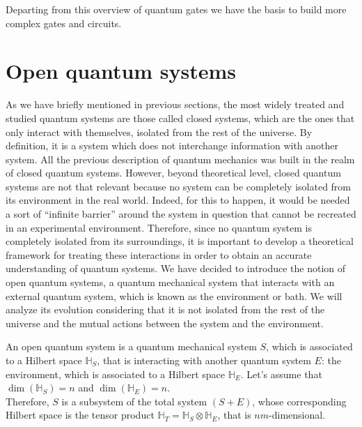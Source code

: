 Departing from this overview of quantum gates we have the basis to build more complex gates and circuits.

\section{Open quantum systems}
As we have briefly mentioned in previous sections, the most widely treated and studied quantum systems are those called closed systems, which are the ones that only interact with themselves, isolated from the rest of the universe. By definition, it is a system which does not interchange information with another system. All the previous description of quantum mechanics was built in the realm of closed quantum systems. However, beyond theoretical level, closed quantum systems are not that relevant because no system can be completely isolated from its environment in the real world. Indeed, for this to happen, it would be needed a sort of ``infinite barrier'' around the system in question that cannot be recreated in an experimental environment. Therefore, since no quantum system is completely isolated from its surroundings, it is important to develop a theoretical framework for treating these interactions in order to obtain an accurate understanding of quantum systems. We have decided to introduce the notion of open quantum systems, a quantum mechanical system that interacts with an external quantum system, which is known as the environment or bath. We will analyze its evolution considering that it is not isolated from the rest of the universe and the mutual actions between the system and the environment. 


\begin{definicion}
    An open quantum system is a quantum mechanical system $S$, which is associated to a Hilbert space $\mathbb{H}_S$, that is interacting with another quantum system $E$: the environment, which is associated to a Hilbert space $\mathbb{H}_E$. Let's assume that $\dim (\mathbb{H}_S)=n$ and $\dim(\mathbb{H}_E)=n$. \\Therefore, $S$ is a subsystem of the total system $(S+E)$, whose corresponding Hilbert space is the tensor product $\mathbb{H}_T=\mathbb{H}_S \otimes \mathbb{H}_E$, that is $nm$-dimensional.
\end{definicion}

